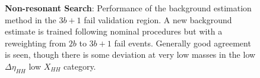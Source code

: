 \begin{figure}[ht]
  \centering
  \hspace*{-2cm}
  \caption{\label{fig:nonres-sr-mhh-3b1f} \textbf{Non-resonant Search}: Performance of the background estimation 
  method in the $3b+1$ fail validation region. A new background estimate is trained following nominal procedures 
  but with a reweighting from $2b$ to $3b+1$ fail events. Generally good agreement is seen, though there is some 
  deviation at very low masses in the low $\Delta\eta_{HH}$ low $X_{HH}$ category.}
\end{figure}

